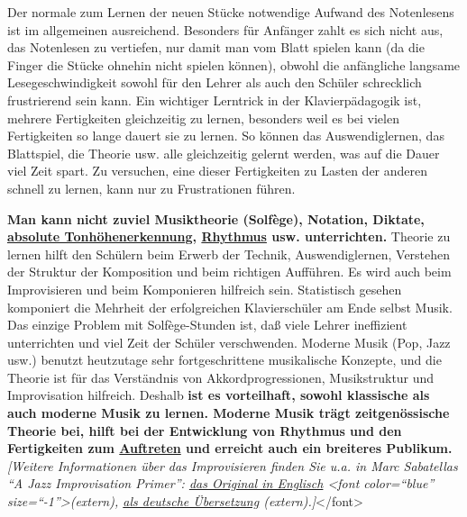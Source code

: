 Der normale zum Lernen der neuen Stücke notwendige Aufwand des Notenlesens ist im allgemeinen ausreichend.
Besonders für Anfänger zahlt es sich nicht aus, das Notenlesen zu vertiefen, nur damit man vom Blatt spielen kann (da die Finger die Stücke ohnehin nicht spielen können), obwohl die anfängliche langsame Lesegeschwindigkeit sowohl für den Lehrer als auch den Schüler schrecklich frustrierend sein kann.
Ein wichtiger Lerntrick in der Klavierpädagogik ist, mehrere Fertigkeiten gleichzeitig zu lernen, besonders weil es bei vielen Fertigkeiten so lange dauert sie zu lernen.
So können das Auswendiglernen, das Blattspiel, die Theorie usw. alle gleichzeitig gelernt werden, was auf die Dauer viel Zeit spart.
Zu versuchen, eine dieser Fertigkeiten zu Lasten der anderen schnell zu lernen, kann nur zu Frustrationen führen.

\textbf{Man kann nicht zuviel Musiktheorie (Solfège), Notation, Diktate, \hyperlink{c1iii12}{absolute Tonhöhenerkennung}, \hyperlink{c1iii1b}{Rhythmus} usw. unterrichten.}
Theorie zu lernen hilft den Schülern beim Erwerb der Technik, Auswendiglernen, Verstehen der Struktur der Komposition und beim richtigen Aufführen.
Es wird auch beim Improvisieren und beim Komponieren hilfreich sein.
Statistisch gesehen komponiert die Mehrheit der erfolgreichen Klavierschüler am Ende selbst Musik.
Das einzige Problem mit Solfège-Stunden ist, daß viele Lehrer ineffizient unterrichten und viel Zeit der Schüler verschwenden.
Moderne Musik (Pop, Jazz usw.) benutzt heutzutage sehr fortgeschrittene musikalische Konzepte, und die Theorie ist für das Verständnis von Akkordprogressionen, Musikstruktur und Improvisation hilfreich.
Deshalb \textbf{ist es vorteilhaft, sowohl klassische als auch moderne Musik zu lernen.
Moderne Musik trägt zeitgenössische Theorie bei, hilft bei der Entwicklung von Rhythmus und den Fertigkeiten zum \hyperlink{c1iii14}{Auftreten} und erreicht auch ein breiteres Publikum.}
\hypertarget{c040119}{}
\textit{[Weitere Informationen über das Improvisieren finden Sie u.a. in Marc Sabatellas \enquote{A Jazz Improvisation Primer}: \hyperref[http://www.outsideshore.com/primer/primer/index.html]{das Original in Englisch} <font color=\enquote{blue} size=\enquote{-1}>(extern), \hyperref[http://msjipde.uteedgar-lins.de/index.html]{als deutsche Übersetzung} (extern).]}</font>

